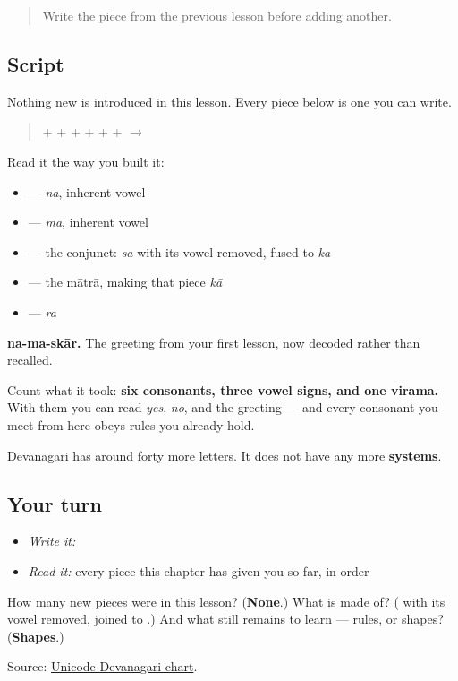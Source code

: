 \label{lesson:MR-W01-namaskar-read}



\begin{quote}
Write the piece from the previous lesson before adding another.
\end{quote}

\subsection*{Script}
Nothing new is introduced in this lesson. Every piece below is one you can write.

\begin{quote}
\textbf{} + \textbf{} + \textbf{} + \textbf{} + \textbf{} + \textbf{} + \textbf{} $\to$ \textbf{}
\end{quote}

Read it the way you built it:

\begin{itemize}
\raggedright
  \item \textbf{} — \emph{na}, inherent vowel
  \item \textbf{} — \emph{ma}, inherent vowel
  \item \textbf{} — the conjunct: \emph{sa} with its vowel removed, fused to \emph{ka}
  \item \textbf{} — the mātrā, making that piece \emph{kā}
  \item \textbf{} — \emph{ra}
\end{itemize}

\textbf{na-ma-skār.} The greeting from your first lesson, now decoded rather than recalled.

Count what it took: \textbf{six consonants, three vowel signs, and one virama.} With them you can read \emph{yes}, \emph{no}, and the greeting — and every consonant you meet from here obeys rules you already hold.

Devanagari has around forty more letters. It does not have any more \textbf{systems}.

\subsection*{Your turn}
\begin{itemize}
\raggedright
  \item \emph{Write it:} 
  \item \emph{Read it:} every piece this chapter has given you so far, in order
\end{itemize}

\begin{tcolorbox}[breakable,colback=teal!4,colframe=teal!35!black,title={Before you move on}]
How many new pieces were in this lesson? (\textbf{None}.) What is \textbf{} made of? (\emph{\textbf{}} with its vowel removed, joined to \emph{\textbf{}}.) And what still remains to learn — rules, or shapes? (\textbf{Shapes}.)

Source: \href{https://www.unicode.org/charts/PDF/U0900.pdf}{Unicode Devanagari chart}.
\end{tcolorbox}
